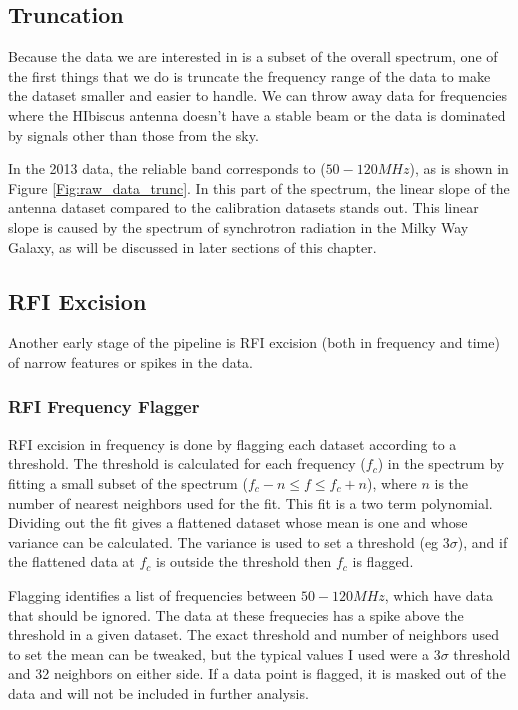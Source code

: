 \subsection{Truncation}

Because the data we are interested in is a subset of the overall spectrum, one of the first things that we do is truncate the frequency range of the data to make the dataset smaller and easier to handle. We can throw away data for frequencies where the HIbiscus antenna doesn't have a stable beam or the data is dominated by signals other than those from the sky. 

In the 2013 data, the reliable band corresponds to ($50-120 MHz$), as is shown in Figure \ref{Fig:raw_data_trunc}. In this part of the spectrum, the linear slope of the antenna dataset compared to the calibration datasets stands out. This linear slope is caused by the spectrum of synchrotron radiation in the Milky Way Galaxy, as will be discussed in later sections of this chapter. 


\subsection{RFI Excision}

Another early stage of the pipeline is RFI excision (both in frequency and time) of narrow features or spikes in the data. 

\subsubsection{RFI Frequency Flagger}

RFI excision in frequency is done by flagging each dataset according to a threshold. The threshold is calculated for each frequency ($f_c$) in the spectrum by fitting a small subset of the spectrum ($f_c-n \leq f \leq f_c + n$), where $n$ is the number of nearest neighbors used for the fit. This fit is a two term polynomial. Dividing out the fit gives a flattened dataset whose mean is one and whose variance can be calculated. The variance is used to set a threshold (eg $3 \sigma$), and if the flattened data at $f_c$ is outside the threshold then $f_c$ is flagged. 

Flagging identifies a list of frequencies between $50-120 MHz$, which have data that should be ignored. The data at these frequecies has a spike above the threshold in a given dataset. The exact threshold and number of neighbors used to set the mean can be tweaked, but the typical values I used were a 3$\sigma$ threshold and 32 neighbors on either side. If a data point is flagged, it is masked out of the data and will not be included in further analysis.  

